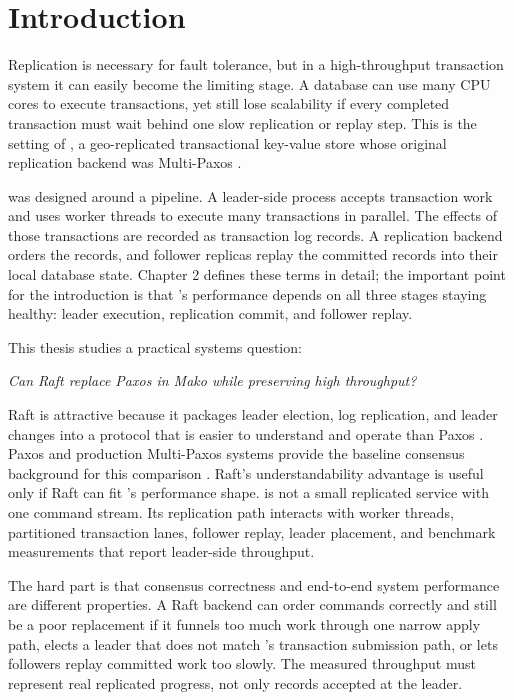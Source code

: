 \chapter{Introduction}

Replication is necessary for fault tolerance, but in a high-throughput
transaction system it can easily become the limiting stage. A database can use
many CPU cores to execute transactions, yet still lose scalability if every
completed transaction must wait behind one slow replication or replay step.
This is the setting of \Mako{}, a geo-replicated transactional key-value store
whose original replication backend was Multi-Paxos \cite{mako-osdi25}.

\Mako{} was designed around a pipeline. A leader-side process accepts
transaction work and uses worker threads to execute many transactions in
parallel. The effects of those transactions are recorded as transaction log
records. A replication backend orders the records, and follower replicas replay
the committed records into their local database state. Chapter 2 defines these
terms in detail; the important point for the introduction is that \Mako{}'s
performance depends on all three stages staying healthy: leader execution,
replication commit, and follower replay.

This thesis studies a practical systems question:

\begin{center}
\emph{Can Raft replace Paxos in Mako while preserving high throughput?}
\end{center}

Raft is attractive because it packages leader election, log replication, and
leader changes into a protocol that is easier to understand and operate than
Paxos \cite{raft-atc14}. Paxos and production Multi-Paxos systems provide the
baseline consensus background for this comparison
\cite{paxos-made-simple,paxos-made-live}. Raft's understandability advantage
is useful only if Raft can fit \Mako{}'s performance shape. \Mako{} is not a
small replicated service with one command stream. Its replication path
interacts with worker threads, partitioned transaction lanes, follower replay,
leader placement, and benchmark measurements that report leader-side
throughput.

The hard part is that consensus correctness and end-to-end system performance
are different properties. A Raft backend can order commands correctly and
still be a poor replacement if it funnels too much work through one narrow
apply path, elects a leader that does not match \Mako{}'s transaction
submission path, or lets followers replay committed work too slowly. The
measured throughput must represent real replicated progress, not only records
accepted at the leader.

